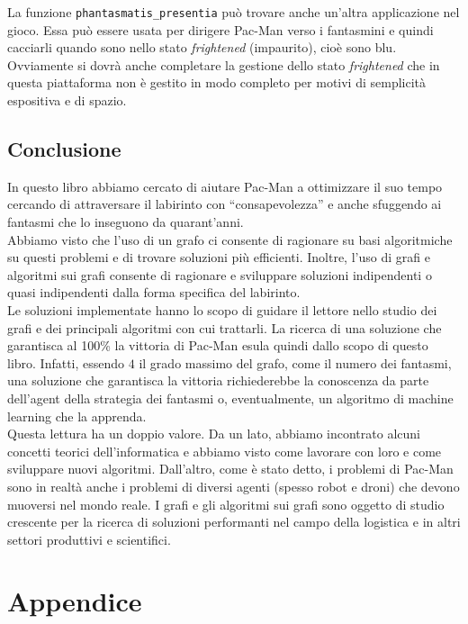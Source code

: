\documentclass[8pt]{book}
\begin{document}
La funzione \texttt{phantasmatis\_presentia} può trovare anche un'altra applicazione nel gioco. Essa può essere usata per dirigere Pac-Man verso i fantasmini e quindi cacciarli quando sono nello stato \emph{frightened} (impaurito), cioè sono blu. Ovviamente si dovrà anche completare la gestione dello stato \emph{frightened} che in questa piattaforma non è gestito in modo completo per motivi di semplicità espositiva e di spazio.

\chapter{Conclusione}\label{tocux5f22}

In questo libro abbiamo cercato di aiutare Pac-Man a ottimizzare il suo tempo cercando di attraversare il labirinto con ``consapevolezza'' e anche sfuggendo ai fantasmi che lo inseguono da quarant'anni.\\
Abbiamo visto che l'uso di un grafo ci consente di ragionare su basi algoritmiche su questi problemi e di trovare soluzioni più efficienti. Inoltre, l'uso di grafi e algoritmi sui grafi consente di ragionare e sviluppare soluzioni indipendenti o quasi indipendenti dalla forma specifica del labirinto.\\

Le soluzioni implementate hanno lo scopo di guidare il lettore nello studio dei grafi e dei principali algoritmi con cui trattarli. La ricerca di una soluzione che garantisca al 100\% la vittoria di Pac-Man esula quindi dallo scopo di questo libro. Infatti, essendo $4$ il grado massimo del grafo, come il numero dei fantasmi, una soluzione che garantisca la vittoria richiederebbe la conoscenza da parte dell'agent della strategia dei fantasmi o, eventualmente, un algoritmo di machine learning che la apprenda.\\ 

Questa lettura ha un doppio valore. Da un lato, abbiamo incontrato alcuni concetti teorici dell'informatica e abbiamo visto come lavorare con loro e come sviluppare nuovi algoritmi. Dall'altro, come è stato detto, i problemi di Pac-Man sono in realtà anche i problemi di diversi agenti (spesso robot e droni) che devono muoversi nel mondo reale. I grafi e gli algoritmi sui grafi sono oggetto di studio crescente per la ricerca di soluzioni performanti nel campo della logistica e in altri settori produttivi e scientifici.

\part{Appendice}
\end{document}
